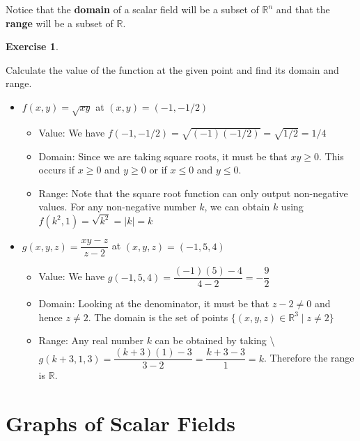 \documentclass[
]{book}
\providecommand{\tightlist}{%
  \setlength{\itemsep}{0pt}\setlength{\parskip}{0pt}}
\theoremstyle{definition}
\theoremstyle{definition}
\theoremstyle{definition}
\newtheorem{exercise}{Exercise}[chapter]
\theoremstyle{definition}
\theoremstyle{remark}
\begin{document}
Notice that the \textbf{domain} of a scalar field will be a subset of \(\mathbb{R}^n\) and that the \textbf{range} will be a subset of \(\mathbb{R}\).

\begin{exercise}
\protect\hypertarget{exr:unlabeled-div-2}{}\label{exr:unlabeled-div-2}

Calculate the value of the function at the given point and find its domain and range.

\begin{itemize}
\tightlist
\item
  \(f(x,y)=\sqrt{xy}\) at \((x,y)=(-1, -1/2)\)

  \begin{itemize}
  \tightlist
  \item
    Value: We have \(f(-1, -1/2)=\sqrt{(-1)(-1/2)}=\sqrt{1/2}=1/4\)
  \item
    Domain: Since we are taking square roots, it must be that \(xy \geq 0\). This occurs if \(x\geq 0\) and \(y\geq 0\) or if \(x\leq0\) and \(y\leq 0\).
  \item
    Range: Note that the square root function can only output non-negative values. For any non-negative number \(k\), we can obtain \(k\) using \(f(k^2,1) = \sqrt{k^2}=|k|=k\)
  \end{itemize}
\item
  \(g(x,y,z)= \dfrac{xy-z}{z-2}\) at \((x,y,z)=(-1,5,4)\)

  \begin{itemize}
  \tightlist
  \item
    Value: We have \(g(-1,5,4)=\dfrac{(-1)(5)-4}{4-2}=-\dfrac{9}{2}\)
  \item
    Domain: Looking at the denominator, it must be that \(z-2 \neq 0\) and hence \(z \neq 2\). The domain is the set of points \(\{(x,y,z)\in\mathbb{R}^3\mid z\neq 2\}\)
  \item
    Range: Any real number \(k\) can be obtained by taking \textbackslash{} \(g(k+3, 1, 3) = \dfrac{(k+3)(1)-3}{3-2}=\dfrac{k+3-3}{1}=k\). Therefore the range is \(\mathbb{R}.\)
  \end{itemize}
\end{itemize}

\end{exercise}

\hypertarget{graphs-of-scalar-fields}{%
\section{Graphs of Scalar Fields}\label{graphs-of-scalar-fields}}
\end{document}
